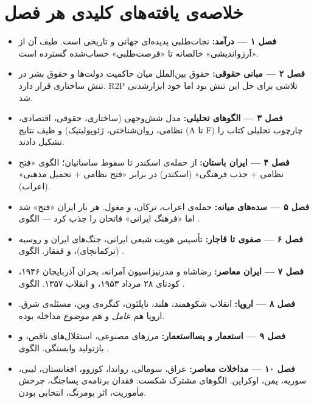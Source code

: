 \section{خلاصه‌ی یافته‌های کلیدی هر فصل}
\label{sec:ch14-summary}


\begin{tcolorbox}[wavebox, title={بخش اول: مبانی نظری (فصل‌های ۱–۳)}]
\begin{itemize}
\item \textbf{فصل ۱ — درآمد:} نجات‌طلبی پدیده‌ای جهانی و تاریخی است. طیف آن از «آرزواندیشی» خالصانه تا «فرصت‌طلبی» حساب‌شده گسترده است.
\item \textbf{فصل ۲ — مبانی حقوقی:} حقوق بین‌الملل میان حاکمیت دولت‌ها و حقوق بشر در تنش ساختاری قرار دارد. R2P تلاشی برای حل این تنش بود اما خود ابزارشدنی شد.
\item \textbf{فصل ۳ — الگوهای تحلیلی:} مدل شش‌وجهی (ساختاری، حقوقی، اقتصادی، نظامی، روان‌شناختی، ژئوپولیتیک) و طیف نتایج (A تا F) چارچوب تحلیلی کتاب را تشکیل دادند.
\end{itemize}
\end{tcolorbox}

\begin{tcolorbox}[wavebox, title={بخش دوم: تاریخ ایران (فصل‌های ۴–۷)}]
\begin{itemize}
\item \textbf{فصل ۴ — ایران باستان:} از حمله‌ی اسکندر تا سقوط ساسانیان؛ الگوی «فتح نظامی + جذب فرهنگی» (اسکندر) در برابر «فتح نظامی + تحمیل مذهبی» (اعراب).
\item \textbf{فصل ۵ — سده‌های میانه:} حمله‌ی اعراب، ترکان، و مغول. هر بار ایران «فتح» شد اما «فرهنگ ایرانی» فاتحان را جذب کرد — الگوی .
\item \textbf{فصل ۶ — صفوی تا قاجار:} تأسیس هویت شیعی ایرانی، جنگ‌های ایران و روسیه (ترکمانچای)، و قفقاز. الگوی .
\item \textbf{فصل ۷ — ایران معاصر:} رضاشاه و مدرنیزاسیون آمرانه، بحران آذربایجان ۱۹۴۶، کودتای ۲۸ مرداد ۱۹۵۳، و انقلاب ۱۳۵۷. الگوی .
\end{itemize}
\end{tcolorbox}

\begin{tcolorbox}[wavebox, title={بخش سوم: تجربه‌ی جهانی (فصل‌های ۸–۱۰)}]
\begin{itemize}
\item \textbf{فصل ۸ — اروپا:} انقلاب شکوهمند، هلند، ناپلئون، کنگره‌ی وین، مسئله‌ی شرق. اروپا هم \textit{عامل} و هم \textit{موضوع} مداخله بوده.
\item \textbf{فصل ۹ — استعمار و پسااستعمار:} مرزهای مصنوعی، استقلال‌های ناقص، و بازتولید وابستگی. الگوی .
\item \textbf{فصل ۱۰ — مداخلات معاصر:} عراق، سومالی، رواندا، کوزوو، افغانستان، لیبی، سوریه، یمن، اوکراین. الگوهای مشترک شکست: فقدان برنامه‌ی پساجنگ، چرخش مأموریت، اثر بومرنگ، انتخابی بودن.
\end{itemize}
\end{tcolorbox}

